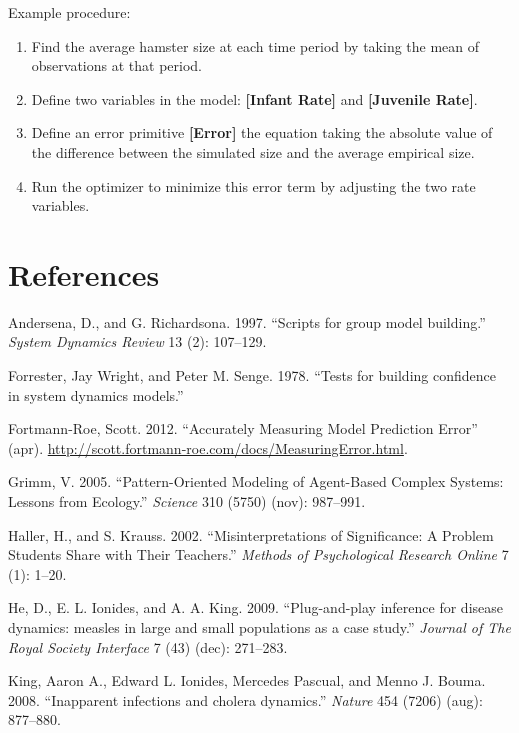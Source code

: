 \documentclass[]{memoir}
\newcommand{\p}[1]{\textbf{{[}#1{]}}}
\begin{document}

Example procedure:

\begin{enumerate}
\def\labelenumi{\arabic{enumi}.}
\itemsep1pt\parskip0pt
\item
  Find the average hamster size at each time period by taking the mean
  of observations at that period.
\item
  Define two variables in the model: \p{Infant Rate} and
  \p{Juvenile Rate}.
\item
  Define an error primitive \p{Error} the equation taking the absolute
  value of the difference between the simulated size and the average
  empirical size.
\item
  Run the optimizer to minimize this error term by adjusting the two
  rate variables.
\end{enumerate}

\chapter{References}

Andersena, D., and G. Richardsona. 1997. ``Scripts for group model
building.'' \emph{System Dynamics Review} 13 (2): 107--129.

Forrester, Jay Wright, and Peter M. Senge. 1978. ``Tests for building
confidence in system dynamics models.''

Fortmann-Roe, Scott. 2012. ``Accurately Measuring Model Prediction
Error'' (apr).
\url{http://scott.fortmann-roe.com/docs/MeasuringError.html}.

Grimm, V. 2005. ``Pattern-Oriented Modeling of Agent-Based Complex
Systems: Lessons from Ecology.'' \emph{Science} 310 (5750) (nov):
987--991.

Haller, H., and S. Krauss. 2002. ``Misinterpretations of Significance: A
Problem Students Share with Their Teachers.'' \emph{Methods of
Psychological Research Online} 7 (1): 1--20.

He, D., E. L. Ionides, and A. A. King. 2009. ``Plug-and-play inference
for disease dynamics: measles in large and small populations as a case
study.'' \emph{Journal of The Royal Society Interface} 7 (43) (dec):
271--283.

King, Aaron A., Edward L. Ionides, Mercedes Pascual, and Menno J. Bouma.
2008. ``Inapparent infections and cholera dynamics.'' \emph{Nature} 454
(7206) (aug): 877--880.
\end{document}
